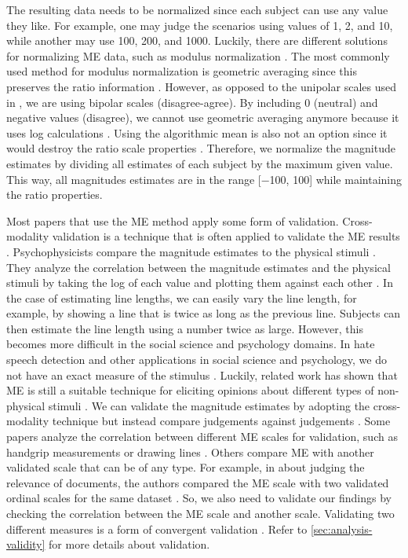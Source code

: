 The resulting data needs to be normalized since each subject can use any value they like. For example, one may judge the scenarios using values of 1, 2, and 10, while another may use 100, 200, and 1000. Luckily, there are different solutions for normalizing ME data, such as modulus normalization \cite{moskowitz1977magnitude}. The most commonly used method for modulus normalization is geometric averaging since this preserves the ratio information \cite{moskowitz1977magnitude, mcgee2004master}. However, as opposed to the unipolar scales used in \cite{bard1996magnitude, mcgee2004master}, we are using bipolar scales (disagree-agree). By including 0 (neutral) and negative values (disagree), we cannot use geometric averaging anymore because it uses log calculations \cite{moskowitz1977magnitude}. Using the algorithmic mean is also not an option since it would destroy the ratio scale properties \cite{moskowitz1977magnitude}. Therefore, we normalize the magnitude estimates by dividing all estimates of each subject by the maximum given value. This way, all magnitudes estimates are in the range [−100, 100] while maintaining the ratio properties.

Most papers that use the ME method apply some form of validation. Cross-modality validation is a technique that is often applied to validate the ME results \cite{bard1996magnitude}. Psychophysicists compare the magnitude estimates to the physical stimuli \cite{bard1996magnitude}. They analyze the correlation between the magnitude estimates and the physical stimuli by taking the log of each value and plotting them against each other \cite{bard1996magnitude}. In the case of estimating line lengths, we can easily vary the line length, for example, by showing a line that is twice as long as the previous line. Subjects can then estimate the line length using a number twice as large. However, this becomes more difficult in the social science and psychology domains. In hate speech detection and other applications in social science and psychology, we do not have an exact measure of the stimulus \cite{bard1996magnitude}. Luckily, related work has shown that ME is still a suitable technique for eliciting opinions about different types of non-physical stimuli \cite{bard1996magnitude, mcgee2004master, maddalena2017crowdsourcing, lodge1979comparisons}. We can validate the magnitude estimates by adopting the cross-modality technique but instead compare judgements against judgements \cite{bard1996magnitude, lodge1979comparisons}. Some papers analyze the correlation between different ME scales for validation, such as handgrip measurements or drawing lines \cite{bard1996magnitude, lodge1976calibration}. Others compare ME with another validated scale that can be of any type. For example, in \cite{maddalena2017crowdsourcing} about judging the relevance of documents, the authors compared the ME scale with two validated ordinal scales for the same dataset \cite{maddalena2017crowdsourcing}. So, we also need to validate our findings by checking the correlation between the ME scale and another scale. Validating two different measures is a form of convergent validation \cite{fitzner2007reliability}. Refer to \ref{sec:analysis-validity} for more details about validation.

